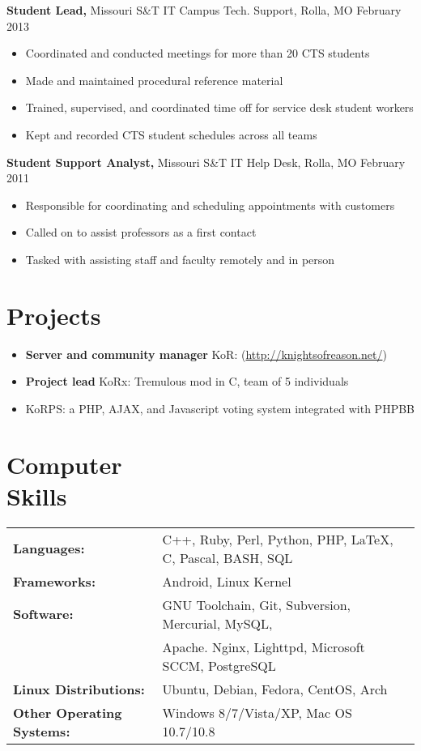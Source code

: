 \documentclass[margin]{res}
\begin{document}
\begin{resume}
     {\bf Student Lead,}  Missouri S\&T IT Campus Tech. Support, Rolla, MO \hfill February 2013
       \begin{itemize} \itemsep -1pt  %
         \item Coordinated and conducted meetings for more than 20 CTS students
         \item Made and maintained procedural reference material
         \item Trained, supervised, and coordinated time off for service desk student workers
         \item Kept and recorded CTS student schedules across all teams
       \end{itemize}
     
     {\bf Student Support Analyst,} Missouri S\&T IT Help Desk, Rolla, MO \hfill February 2011
       \begin{itemize} \itemsep -1pt  %
         \item Responsible for coordinating and scheduling appointments with customers
         \item Called on to assist professors as a first contact
         \item Tasked with assisting staff and faculty remotely and in person
       \end{itemize}

    \section{Projects} 
      \begin{itemize} \itemsep -1pt
        \item {\bf Server and community manager} KoR: (\url{http://knightsofreason.net/})
        \item {\bf Project lead} KoRx: Tremulous mod in C, team of 5 individuals
        \item KoRPS: a PHP, AJAX, and Javascript voting system integrated with PHPBB
      \end{itemize}

    \section{Computer \\ Skills}
      \begin{tabular}{l p{3.6in}}
        {\bf Languages:} & C++, Ruby, Perl, Python, PHP, \LaTeX, C, Pascal, BASH, SQL \\ [1pt]
        {\bf Frameworks:} & Android, Linux Kernel \\ [1pt]
        {\bf Software:} & GNU Toolchain, Git, Subversion, Mercurial, MySQL, \\
        & Apache. Nginx, Lighttpd, Microsoft SCCM, PostgreSQL \\ [1pt]
        {\bf Linux Distributions:} & Ubuntu, Debian, Fedora, CentOS, Arch \\ [1pt]
        {\bf Other Operating Systems:} & Windows 8/7/Vista/XP, Mac OS 10.7/10.8 \\ [1pt]
      \end{tabular}

  \end{resume} 
\end{document}
